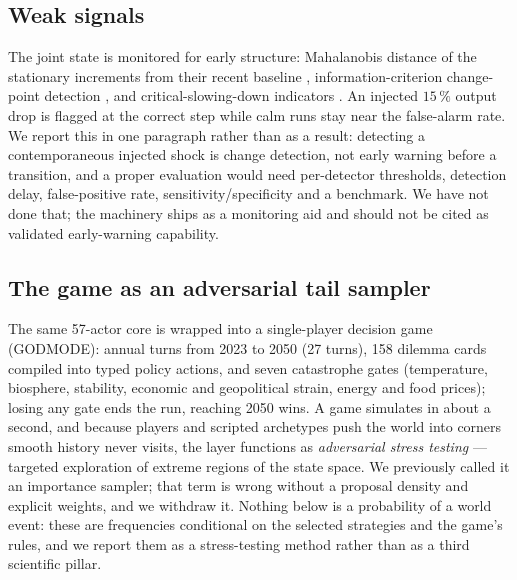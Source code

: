 \documentclass[12pt,a4paper]{article}
\begin{document}
\subsection{Weak signals}

The joint state is monitored for early structure: Mahalanobis distance of the stationary
increments from their recent baseline \citep{mahalanobis1936,wilson1931},
information-criterion change-point detection \citep{schwarz1978}, and critical-slowing-down
indicators \citep{scheffer2009}. An injected $15\,\%$ output drop is flagged at the correct
step while calm runs stay near the false-alarm rate. We report this in one paragraph rather
than as a result: detecting a contemporaneous injected shock is change detection, not early
warning before a transition, and a proper evaluation would need per-detector thresholds,
detection delay, false-positive rate, sensitivity/specificity and a benchmark. We have not done
that; the machinery ships as a monitoring aid and should not be cited as validated
early-warning capability.

\subsection{The game as an adversarial tail sampler}

The same 57-actor core is wrapped into a single-player decision game (GODMODE): annual turns
from 2023 to 2050 (27 turns), 158 dilemma cards compiled into typed policy actions, and seven
catastrophe gates (temperature, biosphere, stability, economic and geopolitical strain, energy
and food prices); losing any gate ends the run, reaching 2050 wins. A game simulates in about a
second, and because players and scripted archetypes push the world into corners smooth history
never visits, the layer functions as \emph{adversarial stress testing} --- targeted exploration
of extreme regions of the state space. We previously called it an importance sampler; that term
is wrong without a proposal density and explicit weights, and we withdraw it. Nothing below is
a probability of a world event: these are frequencies conditional on the selected strategies
and the game's rules, and we report them as a stress-testing method rather than as a third
scientific pillar.
\end{document}
